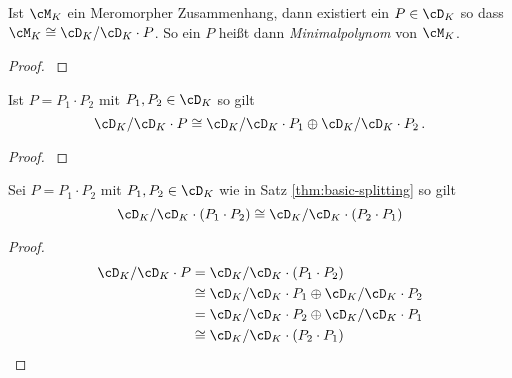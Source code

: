 \begin{lemdef}
\cite[Satz 4.12]{ZulaBarbara}
\cite[Thm 4.3.2]{sabbah_cimpa90}
Ist $\cM_K$ ein Meromorpher Zusammenhang, dann existiert ein $P\in\cD_K$ so
dass $\cM_K\cong\cD_K/\cD_K\cdot P$. So ein $P$ heißt dann
\emph{Minimalpolynom} von
$\cM_K$.
\end{lemdef}
\begin{proof}
\cite[Satz 4.12]{ZulaBarbara}
\end{proof}
\begin{comment}
\begin{rem}
\cite[Proof of Theorem 5.4.7]{sabbah_cimpa90}
\[
\dim_{\hat K}\cM_{\hat K} =\deg P \mbox{ wenn } \cM_{\hat K}=\cD/\cD\cdot P
\]
\end{rem}
\end{comment}
\begin{thm}\label{thm:basic-splitting}
\cite[Seite 64]{ZulaBarbara} %
Ist $P=P_1\cdot P_2$ mit $P_1,P_2\in \cD_K$ so gilt
\[
\cD_K/\cD_K\cdot P \cong \cD_K/\cD_K\cdot P_1 \oplus \cD_K/\cD_K\cdot P_2 \,.
\]
\end{thm}
\begin{proof}
\cite[Seite 57-64]{ZulaBarbara}
\end{proof}
\begin{cor}
Sei $P=P_1\cdot P_2$ mit $P_1,P_2\in \cD_K$ wie in Satz
\ref{thm:basic-splitting} so gilt
\[
\cD_K/\cD_K\cdot (P_1\cdot P_2) \cong \cD_K/\cD_K\cdot (P_2 \cdot P_1)
\]
\end{cor}
\begin{proof}
\begin{align*}
\cD_K/\cD_K\cdot P &= \cD_K/\cD_K\cdot (P_1\cdot P_2)\\
  &\cong \cD_K/\cD_K\cdot P_1 \oplus \cD_K/\cD_K\cdot P_2\\
  &= \cD_K/\cD_K\cdot P_2 \oplus \cD_K/\cD_K\cdot P_1\\
  &\cong \cD_K/\cD_K\cdot (P_2 \cdot P_1)
\end{align*}
\end{proof}

